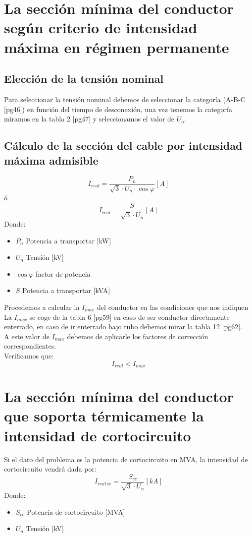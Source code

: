 \documentclass[10pt,a4paper]{article}
\begin{document}
\section{La sección mínima del conductor según criterio de intensidad máxima en régimen 
permanente}
\subsection{Elección de la tensión nominal}
Para seleccionar la tensión nominal debemos de seleccionar la categoría (A-B-C [pg46]) en función del tiempo de desconexión, una vez tenemos la categoría miramos en la tabla 2 [pg47] y seleccionamos el valor de $U_o$.

\subsection{Cálculo de la sección del cable por intensidad máxima admisible}
$$
I_{real}=\frac{P_{n}}{\sqrt{3} \cdot U_{n} \cdot \cos \varphi} [A]
$$
ó
$$
I_{real}=\frac{S}{\sqrt{3} \cdot U_{n}} [A]
$$
Donde:
\begin{itemize}
    \item $P_n$ Potencia a transportar [kW]
    \item $U_n$ Tensión [kV]
    \item $\cos \varphi$ factor de potencia
    \item $S$ Potencia a transportar [kVA]
\end{itemize}

Procedemos a calcular la $I_{max}$ del conductor en las condiciones que nos indiquen
La $I_{max}$ se coge de la tabla 6 [pg59] en caso de ser conductor directamente enterrado, en caso de ir enterrado bajo tubo debemos mirar la tabla 12 [pg62].
\\

A este valor de $I_{max}$ debemos de aplicarle los factores de corrección correspondientes.
\\

Verificamos que:
$$
I_{real} < I_{max}
$$
\newpage
\section{La sección mínima del conductor que soporta térmicamente la intensidad de 
cortocircuito}
Si el dato del problema es la potencia de cortocircuito en MVA, la intensidad de cortocircuito 
vendrá dada por:
$$
I_{real\, cc}=\frac{S_{c c}}{\sqrt{3} \cdot U_{n}} [kA]
$$
Donde:
\begin{itemize}
    \item $S_{cc}$ Potencia de cortocircuito [MVA]
    \item $U_n$ Tensión [kV]
\end{itemize}
\end{document}
